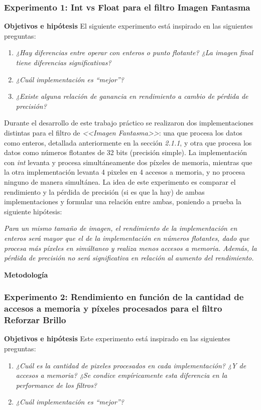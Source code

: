 \documentclass[a4paper]{article}
\begin{document}
\subsubsection{Experimento 1: Int vs Float para el filtro Imagen Fantasma}

\justify
\textbf{Objetivos e hipótesis}
\justify
El siguiente experimento está inspirado en las siguientes preguntas:
\justify
\begin{enumerate}
	\item \textit{¿Hay diferencias entre operar con enteros o punto flotante? ¿La imagen final tiene diferencias significativas?}
	\item \textit{¿Cuál implementación es “mejor”?}
	\item \textit{¿Existe alguna relación de ganancia en rendimiento a cambio de pérdida de precisión?}
\end{enumerate}
\justify
Durante el desarrollo de este trabajo práctico se realizaron dos implementaciones distintas para el filtro de \textit{<<Imagen Fantasma>>}: una que procesa los datos como enteros, detallada anteriormente en la sección \textit{2.1.1}, y otra que procesa los datos como números flotantes de 32 bits (precisión simple). La implementación con \textit{int} levanta y procesa simultáneamente dos píxeles de memoria, mientras que la otra implementación levanta 4 pixeles en 4 accesos a memoria, y no procesa ninguno de manera simultánea. La idea de este experimento es comparar el rendimiento y la pérdida de precisión (si es que la hay) de ambas implementaciones y formular una relación entre ambas, poniendo a prueba la siguiente hipótesis:

\justify
\textit{Para un mismo tamaño de imagen, el rendimiento de la implementación en enteros será mayor que el de la implementación en números flotantes, dado que procesa más píxeles en simúltaneo y realiza menos accesos a memoria. Además, la pérdida de precisión no será significativa en relación al aumento del rendimiento.}   

\justify
\textbf{Metodología}
\justify


\justify


\subsubsection{Experimento 2: Rendimiento en función de la cantidad de accesos a memoria y píxeles procesados para el filtro Reforzar Brillo}

\justify
\textbf{Objetivos e hipótesis}
\justify
Este experimento está inspirado en las siguientes preguntas:
\justify
\begin{enumerate}
	\item \textit{¿Cuál es la cantidad de pixeles procesados en cada implementación? ¿Y de accesos a memoria? ¿Se condice empíricamente esta diferencia en la performance de los filtros?}
	\item \textit{¿Cuál implementación es “mejor”?}\\
	 
\end{enumerate}
\end{document}
